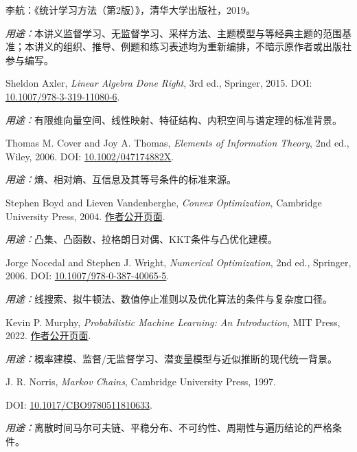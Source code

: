 \begin{enumerate}[leftmargin=2.4em,label={[\arabic{enumi}]}]
  \item 李航：《统计学习方法（第2版）》，清华大学出版社，2019。\par
  \emph{用途：}本讲义监督学习、无监督学习、采样方法、主题模型与\PageRank{}等经典主题的范围基准；本讲义的组织、推导、例题和练习表述均为重新编排，不暗示原作者或出版社参与编写。

  \item Sheldon Axler, \emph{Linear Algebra Done Right}, 3rd ed., Springer, 2015. DOI: \href{https://doi.org/10.1007/978-3-319-11080-6}{10.1007/978-3-319-11080-6}.\par
  \emph{用途：}有限维向量空间、线性映射、特征结构、内积空间与谱定理的标准背景。

  \item Thomas M. Cover and Joy A. Thomas, \emph{Elements of Information Theory}, 2nd ed., Wiley, 2006. DOI: \href{https://doi.org/10.1002/047174882X}{10.1002/047174882X}.\par
  \emph{用途：}熵、相对熵、互信息及其等号条件的标准来源。

  \item Stephen Boyd and Lieven Vandenberghe, \emph{Convex Optimization}, Cambridge University Press, 2004. \href{https://web.stanford.edu/~boyd/cvxbook/}{作者公开页面}.\par
  \emph{用途：}凸集、凸函数、拉格朗日对偶、KKT条件与凸优化建模。

  \item Jorge Nocedal and Stephen J. Wright, \emph{Numerical Optimization}, 2nd ed., Springer, 2006. DOI: \href{https://doi.org/10.1007/978-0-387-40065-5}{10.1007/978-0-387-40065-5}.\par
  \emph{用途：}线搜索、拟牛顿法、数值停止准则以及优化算法的条件与复杂度口径。

  \item Kevin P. Murphy, \emph{Probabilistic Machine Learning: An Introduction}, MIT Press, 2022. \href{https://probml.github.io/book1}{作者公开页面}.\par
  \emph{用途：}概率建模、监督/无监督学习、潜变量模型与近似推断的现代统一背景。

  \item J. R. Norris, \emph{Markov Chains}, Cambridge University Press, 1997.\par
  DOI: \href{https://doi.org/10.1017/CBO9780511810633}{10.1017/CBO9780511810633}.\par
  \emph{用途：}离散时间马尔可夫链、平稳分布、不可约性、周期性与遍历结论的严格条件。


\end{enumerate}
